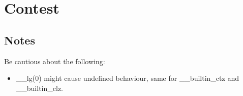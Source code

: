 \chapter{Contest}


\section{Notes}
Be cautious about the following:
\begin{itemize}
	\item \_\_lg(0) might cause undefined behaviour, same for \_\_builtin_ctz and \_\_builtin_clz.
\end{itemize}
